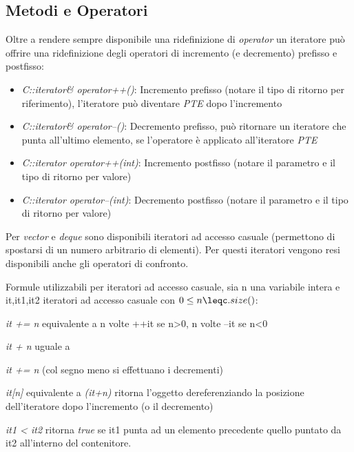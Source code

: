 \subsection{Metodi e Operatori}
Oltre a rendere sempre disponibile una ridefinizione di \textit{operator\textasteriskcentered} un iteratore può offrire una ridefinizione degli operatori di incremento (e decremento) prefisso e postfisso:

\begin{itemize}
	\item \textit{C::iterator\& operator++()}: Incremento prefisso (notare il tipo di ritorno per riferimento), l'iteratore può diventare \textit{PTE} dopo l'incremento
	\item \textit{C::iterator\& operator--()}: Decremento prefisso, può ritornare un iteratore che punta all'ultimo elemento, se l'operatore è applicato all'iteratore \textit{PTE}
	\item \textit{C::iterator operator++(int)}: Incremento postfisso (notare il parametro e il tipo di ritorno per valore)
	\item \textit{C::iterator operator--(int)}: Decremento postfisso (notare il parametro e il tipo di ritorno per valore)
\end{itemize}

Per \textit{vector} e \textit{deque} sono disponibili iteratori ad accesso casuale (permettono di spostarsi di un numero arbitrario di elementi). Per questi iteratori vengono resi disponibili anche gli operatori di confronto.

Formule utilizzabili per iteratori ad accesso casuale, sia n una variabile intera e it,it1,it2 iteratori ad accesso casuale con $ 0\leq n \leqc.size() $:

\begin{itemize*}
	\item \textit{it += n} equivalente a n volte ++it se n>0, n volte --it se n<0
	\item \textit{it + n} uguale a \item \textit{it += n} (col segno meno si effettuano i decrementi)
	\item \textit{it[n]} equivalente a \textit{\textasteriskcentered(it+n)} ritorna l'oggetto dereferenziando la posizione dell'iteratore dopo l'incremento (o il decremento)
	\item \textit{it1 < it2} ritorna \textit{true} se it1 punta ad un elemento precedente quello puntato da it2 all'interno del contenitore.
\end{itemize*}

